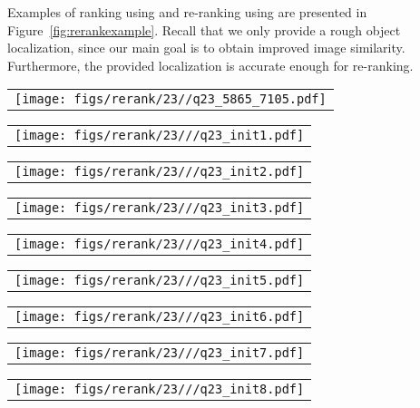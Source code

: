 Examples of ranking using \gfv and re-ranking using \deeploc are presented in Figure~\ref{fig:rerankexample}.
Recall that we only provide a rough object localization, since our main goal is to obtain improved image similarity.
Furthermore, the provided localization is accurate enough for re-ranking.

\begin{figure*}[t]
\scriptsize
\newcommand{\figh}{10ex}
\centering

\begin{tabular}{@{\sssp}c@{\sssp}}\texttt{[image: figs/rerank/23//q23\_5865\_7105.pdf]}\end{tabular} 
\begin{tabular}{@{\sssp}c@{\sssp}}\texttt{[image: figs/rerank/23///q23\_init1.pdf]}\end{tabular}
\begin{tabular}{@{\sssp}c@{\sssp}}\texttt{[image: figs/rerank/23///q23\_init2.pdf]}\end{tabular}
\begin{tabular}{@{\sssp}c@{\sssp}}\texttt{[image: figs/rerank/23///q23\_init3.pdf]}\end{tabular}
\begin{tabular}{@{\sssp}c@{\sssp}}\texttt{[image: figs/rerank/23///q23\_init4.pdf]}\end{tabular}
\begin{tabular}{@{\sssp}c@{\sssp}}\texttt{[image: figs/rerank/23///q23\_init5.pdf]}\end{tabular}
\begin{tabular}{@{\sssp}c@{\sssp}}\texttt{[image: figs/rerank/23///q23\_init6.pdf]}\end{tabular}
\begin{tabular}{@{\sssp}c@{\sssp}}\texttt{[image: figs/rerank/23///q23\_init7.pdf]}\end{tabular}
\begin{tabular}{@{\sssp}c@{\sssp}}\texttt{[image: figs/rerank/23///q23\_init8.pdf]}\end{tabular}


\end{figure*}
